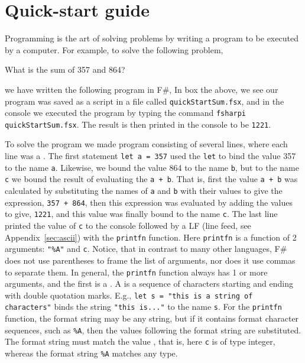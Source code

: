 \chapter{Quick-start guide}
Programming is the art of solving problems by writing a program to be executed by a computer. For example, to solve the following problem,
\begin{problem}
  What is the sum of 357 and 864?
\end{problem}
we have written the following program in F\#,
%
%
In box the above, we see our program was saved as a script in a file called \texttt{quickStartSum.fsx}, and in the console we executed the program by typing the command \lstinline|fsharpi quickStartSum.fsx|. The result is then printed in the console to be \texttt{1221}.

To solve the program we made program consisting of several lines, where each line was a . The first statement \lstinline|let a = 357| used the \lstinline|let|  to bind the value 357 to the name \lstinline|a|. Likewise, we bound the value 864 to the name \lstinline|b|, but to the name \lstinline|c| we bound the result of evaluating the  \lstinline|a + b|. That is, first the value \lstinline|a + b| was calculated by substituting the names of \lstinline|a| and \lstinline|b| with their values to give the expression, \lstinline|357 + 864|, then this expression was evaluated by adding the values to give, \lstinline|1221|, and this value was finally bound to the name \lstinline|c|. The last line printed the value of \lstinline|c| to the console followed by a LF (line feed, see Appendix~\ref{sec:ascii}) with the \lstinline|printfn| function. Here \lstinline|printfn| is a function of 2 arguments: \lstinline|"%A"| and \lstinline|c|. Notice, that in contrast to many other languages, F\# does not use parentheses to frame the list of arguments, nor does it use commas to separate them. In general, the \lstinline|printfn| function always has 1 or more arguments, and the first is a . A  is a sequence of characters starting and ending with double quotation marks. E.g.,  \lstinline|let s = "this is a string of characters"| binds the string \lstinline|"this is..."| to the name \lstinline|s|. For the \lstinline|printfn| function, the format string may be any string, but if it contains format character sequences, such as \lstinline|%A|, then the values following the format string are substituted. The format string must match the value , that is, here \lstinline|c| is of type integer, whereas the format string \lstinline|%A| matches any type.

